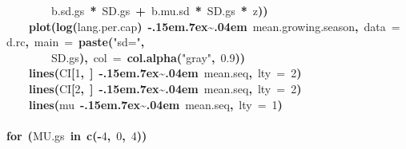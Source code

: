 \documentclass{article}
\makeatletter
\newcommand{\hlnumber}[1]{\textcolor[rgb]{0,0,0}{#1}}%
\newcommand{\hlfunctioncall}[1]{\textcolor[rgb]{.5,0,.33}{\textbf{#1}}}%
\newcommand{\hlstring}[1]{\textcolor[rgb]{.6,.6,1}{#1}}%
\newcommand{\hlkeyword}[1]{\textbf{#1}}%
\newcommand{\hlargument}[1]{\textcolor[rgb]{.69,.25,.02}{#1}}%
\newcommand{\hlsymbol}[1]{#1}%
\def\urltilda{\kern -.15em\lower .7ex\hbox{\~{}}\kern .04em}%
\newcommand{\hlstd}[1]{\textcolor[rgb]{0,0,0}{#1}}%
\newenvironment{kframe}{%
 \def\FrameCommand##1{\hskip\@totalleftmargin \hskip-\fboxsep
 \colorbox{shadecolor}{##1}\hskip-\fboxsep
     \hskip-\linewidth \hskip-\@totalleftmargin \hskip\columnwidth}%
 \MakeFramed {\advance\hsize-\width
   \@totalleftmargin\z@ \linewidth\hsize
   \@setminipage}}%
 {\par\unskip\endMakeFramed}
\newenvironment{knitrout}{}{} %
\makeatother
\begin{document}
\begin{knitrout}
{\begin{kframe}
\begin{flushleft}
\hlstd{}{\ }{\ }{\ }{\ }{\ }{\ }{\ }{\ }\hlsymbol{b.sd.gs}{\ }\hlkeyword{*}{\ }\hlsymbol{SD.gs}{\ }\hlkeyword{+}{\ }\hlsymbol{b.mu.sd}{\ }\hlkeyword{*}{\ }\hlsymbol{SD.gs}{\ }\hlkeyword{*}{\ }\hlsymbol{z}\hlkeyword{)}\hlkeyword{)}\hspace*{\fill}\\
\hlstd{}{\ }{\ }{\ }{\ }\hlfunctioncall{plot}\hlkeyword{(}\hlfunctioncall{log}\hlkeyword{(}\hlsymbol{lang.per.cap}\hlkeyword{)}{\ }\hlkeyword{\urltilda{}}{\ }\hlsymbol{mean.growing.season}\hlkeyword{,}{\ }\hlargument{data}{\ }\hlargument{=}{\ }\hlsymbol{d.rc}\hlkeyword{,}{\ }\hlargument{main}{\ }\hlargument{=}{\ }\hlfunctioncall{paste}\hlkeyword{(}\hlstring{"sd="}\hlkeyword{,}\hspace*{\fill}\\
\hlstd{}{\ }{\ }{\ }{\ }{\ }{\ }{\ }{\ }\hlsymbol{SD.gs}\hlkeyword{)}\hlkeyword{,}{\ }\hlargument{col}{\ }\hlargument{=}{\ }\hlfunctioncall{col.alpha}\hlkeyword{(}\hlstring{"gray"}\hlkeyword{,}{\ }\hlnumber{0.9}\hlkeyword{)}\hlkeyword{)}\hspace*{\fill}\\
\hlstd{}{\ }{\ }{\ }{\ }\hlfunctioncall{lines}\hlkeyword{(}\hlsymbol{CI}\hlkeyword{[}\hlnumber{1}\hlkeyword{,}{\ }\hlkeyword{]}{\ }\hlkeyword{\urltilda{}}{\ }\hlsymbol{mean.seq}\hlkeyword{,}{\ }\hlargument{lty}{\ }\hlargument{=}{\ }\hlnumber{2}\hlkeyword{)}\hspace*{\fill}\\
\hlstd{}{\ }{\ }{\ }{\ }\hlfunctioncall{lines}\hlkeyword{(}\hlsymbol{CI}\hlkeyword{[}\hlnumber{2}\hlkeyword{,}{\ }\hlkeyword{]}{\ }\hlkeyword{\urltilda{}}{\ }\hlsymbol{mean.seq}\hlkeyword{,}{\ }\hlargument{lty}{\ }\hlargument{=}{\ }\hlnumber{2}\hlkeyword{)}\hspace*{\fill}\\
\hlstd{}{\ }{\ }{\ }{\ }\hlfunctioncall{lines}\hlkeyword{(}\hlsymbol{mu}{\ }\hlkeyword{\urltilda{}}{\ }\hlsymbol{mean.seq}\hlkeyword{,}{\ }\hlargument{lty}{\ }\hlargument{=}{\ }\hlnumber{1}\hlkeyword{)}\hspace*{\fill}\\
\hlstd{}\hlkeyword{\usebox{\hlnormalsizeboxclosebrace}}\hspace*{\fill}\\
\hlstd{}\hlkeyword{for}{\ }\hlkeyword{(}\hlsymbol{MU.gs}{\ }\hlkeyword{in}{\ }\hlfunctioncall{c}\hlkeyword{(}\hlkeyword{-}\hlnumber{4}\hlkeyword{,}{\ }\hlnumber{0}\hlkeyword{,}{\ }\hlnumber{4}\hlkeyword{)}\hlkeyword{)}{\ }\hlkeyword{\usebox{\hlnormalsizeboxopenbrace}}\hspace*{\fill}\\

\end{flushleft}
\end{kframe}}
\end{knitrout}
\end{document}
